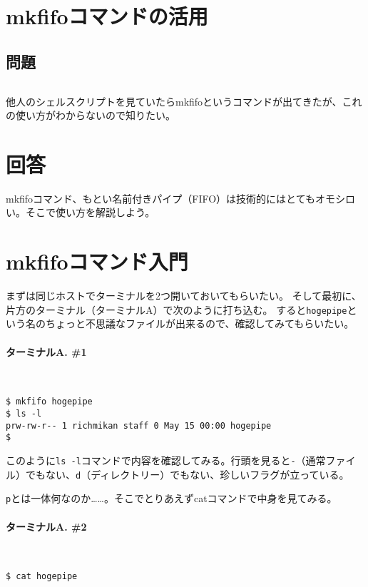 \section{mkfifoコマンドの活用}
\label{recipe:mkfifo}

\subsection*{問題}
\noindent
$\!\!\!\!\!$
\begin{grshfboxit}{160.0mm}
	他人のシェルスクリプトを見ていたらmkfifoというコマンドが出てきたが、これの使い方がわからないので知りたい。
\end{grshfboxit}

\section*{回答}

mkfifoコマンド、もとい名前付きパイプ（FIFO）は技術的にはとてもオモシロい。そこで使い方を解説しよう。

\section*{mkfifoコマンド入門}

まずは同じホストでターミナルを2つ開いておいてもらいたい。
そして最初に、片方のターミナル（ターミナルA）で次のように打ち込む。
すると\verb|hogepipe|という名のちょっと不思議なファイルが出来るので、確認してみてもらいたい。

\paragraph{ターミナルA. \#1} 　
\begin{screen}
	\verb|$ mkfifo hogepipe| \return \\
	\verb|$ ls -l| \return \\
	\verb|prw-rw-r-- 1 richmikan staff 0 May 15 00:00 hogepipe| \\
	\verb|$ |
\end{screen}

このように\verb|ls -l|コマンドで内容を確認してみる。行頭を見ると\verb|-|（通常ファイル）でもない、\verb|d|（ディレクトリー）でもない、珍しいフラグが立っている。

\verb|p|とは一体何なのか……。そこでとりあえずcatコマンドで中身を見てみる。

\paragraph{ターミナルA. \#2} 　
\begin{screen}
	\verb|$ cat hogepipe| \return \\
	\verb||
\end{screen}

